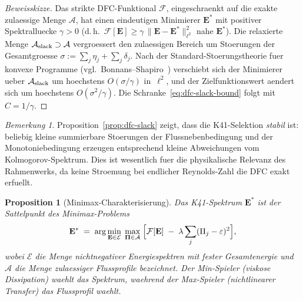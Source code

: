 \documentclass[12pt,a4paper]{article}
\theoremstyle{definition}
\theoremstyle{plain}
\newtheorem{proposition}[definition]{Proposition}
\theoremstyle{remark}
\newtheorem{remark}[definition]{Bemerkung}
\begin{document}
\begin{proof}[Beweisskizze]
Das strikte DFC-Funktional $\mathcal{F}$, eingeschraenkt auf die exakte
zulaessige Menge $\mathcal{A}$, hat einen eindeutigen Minimierer
$\mathbf{E}^*$ mit positiver Spektralluecke $\gamma > 0$ (d.\,h.\
$\mathcal{F}[\mathbf{E}] \ge \gamma\,\|\mathbf{E} -
\mathbf{E}^*\|_{\ell^2}^2$ nahe $\mathbf{E}^*$). Die relaxierte Menge
$\mathcal{A}_{\textup{slack}} \supset \mathcal{A}$ vergroessert den
zulaessigen Bereich um Stoerungen der Gesamtgroesse
$\sigma := \sum_j \eta_j + \sum_j \delta_j$. Nach der
Standard-Stoerungstheorie fuer konvexe Programme (vgl.\
Bonnans--Shapiro~\cite{BonnansShapiro00}) verschiebt sich der Minimierer
ueber $\mathcal{A}_{\textup{slack}}$ um hoechstens $O(\sigma/\gamma)$
in~$\ell^2$, und der Zielfunktionswert aendert sich um hoechstens
$O(\sigma^2/\gamma)$. Die Schranke~\eqref{eq:dfc-slack-bound} folgt
mit $C = 1/\gamma$.
\end{proof}

\begin{remark}
Proposition~\ref{prop:dfc-slack} zeigt, dass die K41-Selektion
\emph{stabil} ist: beliebig kleine summierbare Stoerungen der
Flussnebenbedingung und der Monotoniebedingung erzeugen entsprechend
kleine Abweichungen vom Kolmogorov-Spektrum. Dies ist wesentlich fuer
die physikalische Relevanz des Rahmenwerks, da keine Stroemung bei
endlicher Reynolds-Zahl die DFC exakt erfuellt.
\end{remark}

\begin{proposition}[Minimax-Charakterisierung]
\label{prop:minimax}
Das K41-Spektrum $\mathbf{E}^*$ ist der Sattelpunkt des
Minimax-Problems
\begin{equation}\label{eq:minimax}
  \mathbf{E}^*
  \;=\;
  \arg\min_{\mathbf{E} \in \mathcal{E}}\;
  \max_{\boldsymbol{\Pi} \in \mathcal{A}}\;
  \Bigl[
    \mathcal{F}[\mathbf{E}]
    \;-\;
    \lambda \sum_j (\Pi_j - \varepsilon)^2
  \Bigr],
\end{equation}
wobei $\mathcal{E}$ die Menge nichtnegativer Energiespektren mit fester
Gesamtenergie und $\mathcal{A}$ die Menge zulaessiger Flussprofile
bezeichnet. Der Min-Spieler (viskose Dissipation) waehlt das Spektrum,
waehrend der Max-Spieler (nichtlinearer Transfer) das Flussprofil
waehlt.
\end{proposition}
\end{document}
